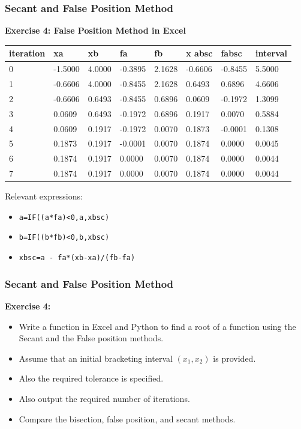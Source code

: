 \begin{frame}[fragile]
  \frametitle{Secant and False Position Method}

  \textbf{Exercise 4: False Position Method in Excel}
  \begin{table}[]
    \begin{tabular}{|l|l|l|l|l|l|l|l|}
      \hline
      iteration & xa      & xb     & fa      & fb     & x absc  & fabsc   & interval \\ \hline
      0         & -1.5000 & 4.0000 & -0.3895 & 2.1628 & -0.6606 & -0.8455 & 5.5000   \\ \hline
      1         & -0.6606 & 4.0000 & -0.8455 & 2.1628 & 0.6493  & 0.6896  & 4.6606   \\ \hline
      2         & -0.6606 & 0.6493 & -0.8455 & 0.6896 & 0.0609  & -0.1972 & 1.3099   \\ \hline
      3         & 0.0609  & 0.6493 & -0.1972 & 0.6896 & 0.1917  & 0.0070  & 0.5884   \\ \hline
      4         & 0.0609  & 0.1917 & -0.1972 & 0.0070 & 0.1873  & -0.0001 & 0.1308   \\ \hline
      5         & 0.1873  & 0.1917 & -0.0001 & 0.0070 & 0.1874  & 0.0000  & 0.0045   \\ \hline
      6         & 0.1874  & 0.1917 & 0.0000  & 0.0070 & 0.1874  & 0.0000  & 0.0044   \\ \hline
      7         & 0.1874  & 0.1917 & 0.0000  & 0.0070 & 0.1874  & 0.0000  & 0.0044   \\ \hline
    \end{tabular}
  \end{table}
  Relevant expressions:
  \begin{itemize}
    \item \lstinline|a=IF((a*fa)<0,a,xbsc)|
    \item \lstinline|b=IF((b*fb)<0,b,xbsc)|
    \item \lstinline|xbsc=a - fa*(xb-xa)/(fb-fa)|
  \end{itemize}
\end{frame}

\begin{frame}[fragile]
  \frametitle{Secant and False Position Method}

  \textbf{Exercise 4:}
  \begin{itemize}
    \item Write a function in Excel and Python to find a root of a function using the Secant and the False position methods.
    \item Assume that an initial bracketing interval \((x_1, x_2)\) is provided.
    \item Also the required tolerance is specified.
    \item Also output the required number of iterations.
    \item Compare the bisection, false position, and secant methods.
  \end{itemize}
\end{frame}


